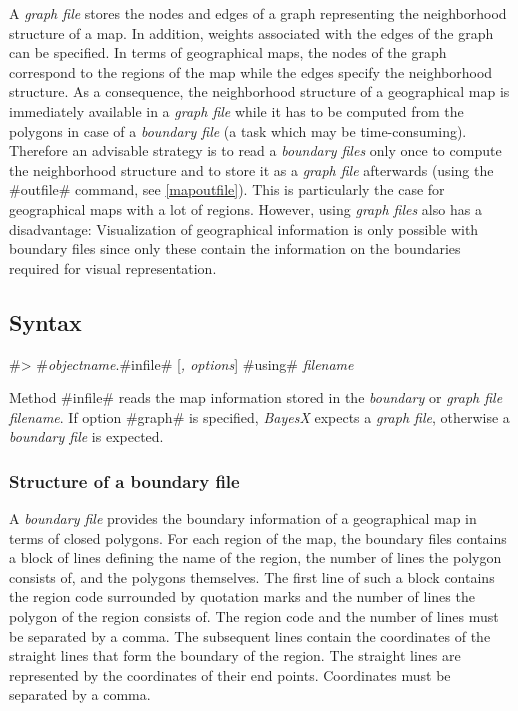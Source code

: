 A {\em graph file} stores the nodes and edges of a graph
representing the neighborhood structure of a map. In addition,
weights associated with the edges of the graph can be specified.
In terms of geographical maps, the nodes of the graph correspond
to the regions of the map while the edges specify the neighborhood
structure. As a consequence, the neighborhood structure of a
geographical map is immediately available in a {\em graph file}
while it has to be computed from the polygons in case of a {\em
boundary file} (a task which may be time-consuming). Therefore an
advisable strategy is to read a {\em boundary files} only once to
compute the neighborhood structure and to store it as a {\em graph
file} afterwards (using the #outfile# command, see
\autoref{mapoutfile}). This is particularly the case for
geographical maps with a lot of regions. However, using {\em graph
files} also has a disadvantage: Visualization of geographical
information is only possible with boundary files since only these
contain the information on the boundaries required for visual
representation.

\subsection{Syntax}

#> #{\em objectname}.#infile# [{\em , options}] #using# {\em filename}

Method #infile# reads the map information stored in the {\em
boundary} or {\em graph file} {\em filename}. If option #graph# is
specified, {\em BayesX} expects a {\em graph file}, otherwise a
{\em boundary file} is expected.

\subsubsection*{Structure of a boundary file}

A {\em boundary file} provides the boundary information of a
geographical map in terms of closed polygons. For each region of
the map, the boundary files contains a block of lines defining the
name of the region, the number of lines the polygon consists of,
and the polygons themselves. The first line of such a block
contains the region code surrounded by quotation marks and the
number of lines the polygon of the region consists of. The region
code and the number of lines must be separated by a comma. The
subsequent lines contain the coordinates of the straight lines
that form the boundary of the region. The straight lines are
represented by the coordinates of their end points. Coordinates
must be separated by a comma.

